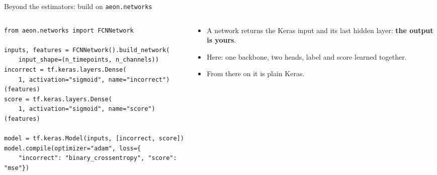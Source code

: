 \documentclass[aspectratio=169,10pt]{beamer}
\begin{document}
\begin{frame}[fragile]{Beyond the estimators: build on \texttt{aeon.networks}}
  \begin{columns}[c]
    \begin{column}{0.62\textwidth}
\begin{lstlisting}
from aeon.networks import FCNNetwork

inputs, features = FCNNetwork().build_network(
    input_shape=(n_timepoints, n_channels))
incorrect = tf.keras.layers.Dense(
    1, activation="sigmoid", name="incorrect")(features)
score = tf.keras.layers.Dense(
    1, activation="sigmoid", name="score")(features)

model = tf.keras.Model(inputs, [incorrect, score])
model.compile(optimizer="adam", loss={
    "incorrect": "binary_crossentropy", "score": "mse"})
\end{lstlisting}
    \end{column}
    \begin{column}{0.36\textwidth}
      \begin{itemize}
        \item A network returns the Keras input and its last hidden layer: \textbf{the output is yours}.
        \item Here: one backbone, two heads, label and score learned together.
        \item From there on it is plain Keras.
      \end{itemize}
    \end{column}
  \end{columns}
\end{frame}
\end{document}
